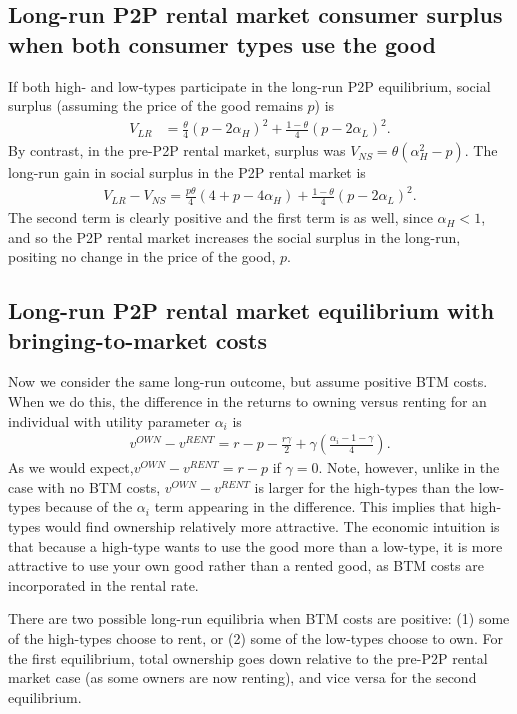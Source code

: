 \documentclass[11pt]{article}
\begin{document}
\subsection{Long-run P2P rental market consumer surplus when both consumer types use the good} 
If both high- and low-types participate in the long-run P2P equilibrium, social surplus (assuming the price of the good remains $p$) is 
\begin{align} 
V_{LR} & = \frac{\theta}{4}(p - 2\alpha_H)^2 + \frac{1-\theta}{4}(p - 2\alpha_L)^2.
\end{align} 
By contrast, in the pre-P2P rental market, surplus was $V_{NS} = \theta(\alpha_H^2 - p)$.  
The long-run gain in social surplus in the P2P rental market is  
\begin{align}
V_{LR} - V_{NS} = \frac{p\theta}{4}(4 + p - 4 \alpha_H) + \frac{1-\theta}{4}(p - 2\alpha_L)^2. 
\end{align}
The second term is clearly positive and the first term is as well, since $\alpha_H < 1$, and so the P2P rental market increases the social surplus in the long-run, positing no change in the price of the good, $p$. 

\subsection{Long-run P2P rental market equilibrium with bringing-to-market costs}
Now we consider the same long-run outcome, but assume positive BTM costs.
When we do this, the difference in the returns to owning versus renting for an individual with utility parameter $\alpha_i$  is 
\begin{align}
  v^{OWN} - v^{RENT} = r - p - \frac{r\gamma}{2} + \gamma \left( \frac{\alpha_i - 1 - \gamma}{4} \right). 
\end{align}
As we would expect,$v^{OWN} - v^{RENT} = r - p$ if $\gamma = 0$. 
Note, however, unlike in the case with no BTM costs, $v^{OWN} - v^{RENT}$ is larger for the high-types than the low-types because of the $\alpha_i$ term appearing in the difference.
This implies that high-types would find ownership relatively more attractive.
The economic intuition is that because a high-type wants to use the good more than a low-type, it is more attractive to use your own good rather than a rented good, as BTM costs are incorporated in the rental rate. 

There are two possible long-run equilibria when BTM costs are positive:
(1) some of the high-types choose to rent, or
(2) some of the low-types choose to own. 
For the first equilibrium, total ownership goes down relative to the pre-P2P rental market case (as some owners are now renting), and vice versa for the second equilibrium. 
\end{document}
